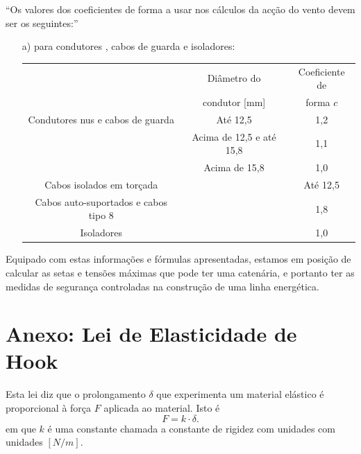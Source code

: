 ``Os valores dos coeficientes de forma a usar nos cálculos da acção do
vento devem ser os seguintes:''
\begin{itemize}[noitemsep,nolistsep]
\item[a)]  para condutores , cabos de guarda e isoladores:
  \begin{table}[!h]
    \centering
    \begin{tabular}{ccc}
      \toprule
      & Diâmetro do & Coeficiente de \\
      &  condutor [\si{mm}] & forma $c$ \\
      \midrule
      Condutores nus e cabos de guarda & Até 12,5 & 1,2\\
      & Acima de 12,5 e até 15,8 & 1,1\\
      & Acima de 15,8 & 1,0\\
      \midrule
      Cabos isolados em torçada & & Até 12,5\\
      Cabos auto-suportados e cabos tipo 8 && 1,8\\
      Isoladores && 1,0\\
      \bottomrule
    \end{tabular}
  \end{table}
\end{itemize}


Equipado com estas informações e fórmulas apresentadas, estamos em posição de calcular as setas e tensões máximas que pode ter uma catenária, e portanto ter as medidas de segurança controladas na construção de uma linha energética.


\section*{Anexo: Lei de Elasticidade de Hook}
Esta lei diz que o prolongamento  $\delta$ que experimenta um material elástico é proporcional à força $F$ aplicada ao material. Isto é
\begin{equation}
 \label{eq:1}
 F = k \cdot \delta.
\end{equation}
em que $k$ é uma constante chamada a constante de rigidez com unidades com
unidades $[N/m]$.

